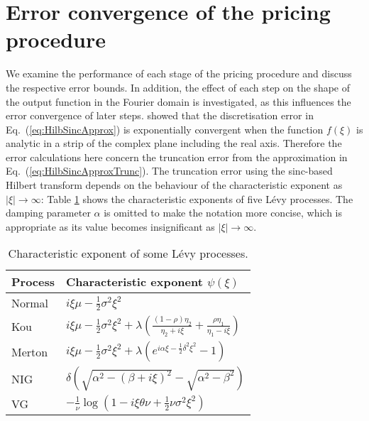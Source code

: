 \documentclass[11pt,a4paper]{article}
\begin{document}
\section{Error convergence of the pricing procedure}\label{sec:errperf}

We examine the performance of each stage of the pricing procedure and discuss the respective error bounds. In addition, the effect of each step on the shape of the output function in the Fourier domain is investigated, as this influences the error convergence of later steps. \cite{Stenger1993} showed that the discretisation error in Eq.~(\ref{eq:HilbSincApprox}) is exponentially convergent when the function $f(\xi)$ is analytic in a strip of the complex plane including the real axis. Therefore the error calculations here concern the truncation error from the approximation in Eq.~(\ref{eq:HilbSincApproxTrunc}). The truncation error using the sinc-based Hilbert transform depends on the behaviour of the characteristic exponent as $|\xi|\rightarrow\infty$: Table \ref{tab:Charexp} shows the characteristic exponents of five L\'evy processes. The damping parameter $\alpha$ is omitted to make the notation more concise, which is appropriate as its value becomes insignificant as $|\xi|\rightarrow\infty$.

\begin{table}[h]
\renewcommand{\arraystretch}{1.5}
\centering
\begin{tabular}{ll}
\hline\hline
Process & Characteristic exponent $\psi(\xi)$ \\
\hline
Normal & $i\xi\mu-\frac{1}{2}\sigma^{2}\xi^{2}$ \\
Kou & $i\xi\mu-\frac{1}{2}\sigma^{2}\xi^{2}+\lambda\left(\frac{(1-\rho)\eta_{2}}{\eta_{2}+i\xi}+\frac{\rho\eta_{1}}{\eta_{1}-i\xi}\right)$ \\
Merton & $i\xi\mu-\frac{1}{2}\sigma^{2}\xi^{2}+\lambda\left(e^{i\alpha\xi-\frac{1}{2}\delta^{2}\xi^{2}}-1\right)$ \\
NIG & $\delta\left(\sqrt{\alpha^{2}-(\beta+i\xi)^{2}}-\sqrt{\alpha^{2}-\beta^{2}}\right)$ \\
VG & $-\frac{1}{\nu}\log\left(1-i\xi\theta\nu+\frac{1}{2}\nu\sigma^2\xi^2\right)$ \\
\hline\hline
\end{tabular}
\caption{Characteristic exponent of some L\'evy processes.}
\label{tab:Charexp}
\end{table}
\end{document}
